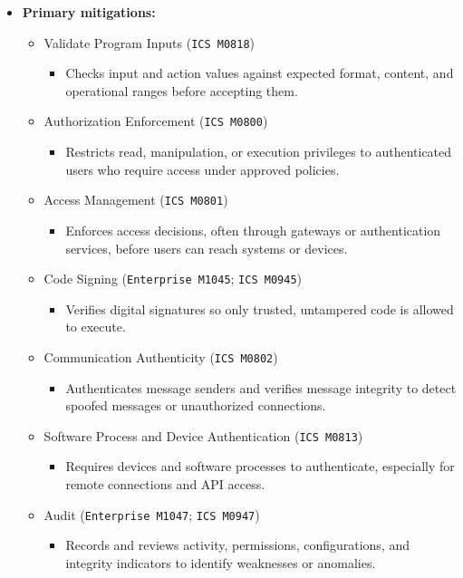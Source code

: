\documentclass[10pt,a4paper,oneside]{report}
\begin{document}
\begin{itemize}
\item \textbf{Primary mitigations:}
\begin{itemize}
\item Validate Program Inputs (\texttt{ICS M0818})
\begin{itemize}
\item Checks input and action values against expected format, content, and operational ranges before accepting them.
\end{itemize}
\item Authorization Enforcement (\texttt{ICS M0800})
\begin{itemize}
\item Restricts read, manipulation, or execution privileges to authenticated users who require access under approved policies.
\end{itemize}
\item Access Management (\texttt{ICS M0801})
\begin{itemize}
\item Enforces access decisions, often through gateways or authentication services, before users can reach systems or devices.
\end{itemize}
\item Code Signing (\texttt{Enterprise M1045}; \texttt{ICS M0945})
\begin{itemize}
\item Verifies digital signatures so only trusted, untampered code is allowed to execute.
\end{itemize}
\item Communication Authenticity (\texttt{ICS M0802})
\begin{itemize}
\item Authenticates message senders and verifies message integrity to detect spoofed messages or unauthorized connections.
\end{itemize}
\item Software Process and Device Authentication (\texttt{ICS M0813})
\begin{itemize}
\item Requires devices and software processes to authenticate, especially for remote connections and API access.
\end{itemize}
\item Audit (\texttt{Enterprise M1047}; \texttt{ICS M0947})
\begin{itemize}
\item Records and reviews activity, permissions, configurations, and integrity indicators to identify weaknesses or anomalies.
\end{itemize}
\end{itemize}
\end{itemize}
\end{document}
